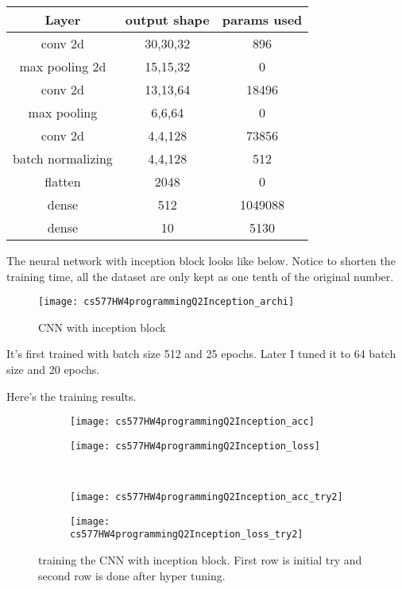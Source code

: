 \documentclass{article}
\begin{document}
\begin{center}
    \begin{tabular}{ccc}
        \hline
        Layer & output shape & params used\\
        \hline 
        conv 2d & 30,30,32 & 896\\
        max pooling 2d & 15,15,32 & 0\\
        conv 2d & 13,13,64 & 18496\\
        max pooling & 6,6,64 & 0\\
        conv 2d & 4,4,128 & 73856\\
        batch normalizing & 4,4,128 & 512\\
        flatten & 2048 & 0\\
        dense & 512 & 1049088\\
        dense & 10 & 5130\\ \hline   
    \end{tabular}
\end{center}

The neural network with inception block looks like below. Notice to shorten the training time, all the dataset are only kept as one tenth of the original number.

\begin{figure}[h!]
    \centering
    \texttt{[image: cs577HW4programmingQ2Inception\_archi]}
    \caption{CNN with inception block}
\end{figure}

It's first trained with batch size 512 and 25 epochs. Later I tuned it to 64 batch size and 20 epochs. 

Here's the training results.

\begin{figure}[h!]
    \centering
    \begin{subfigure}{.48\textwidth}
        \centering
        \texttt{[image: cs577HW4programmingQ2Inception\_acc]}
    \end{subfigure}
    \begin{subfigure}{.48\textwidth}
        \centering
        \texttt{[image: cs577HW4programmingQ2Inception\_loss]}
    \end{subfigure}\\
    \begin{subfigure}{.48\textwidth}
        \centering
        \texttt{[image: cs577HW4programmingQ2Inception\_acc\_try2]}
    \end{subfigure}
    \begin{subfigure}{.48\textwidth}
        \centering
        \texttt{[image: cs577HW4programmingQ2Inception\_loss\_try2]}
    \end{subfigure}
    \caption{training the CNN with inception block. First row is initial try and second row is done after hyper tuning.}
\end{figure}
\end{document}
